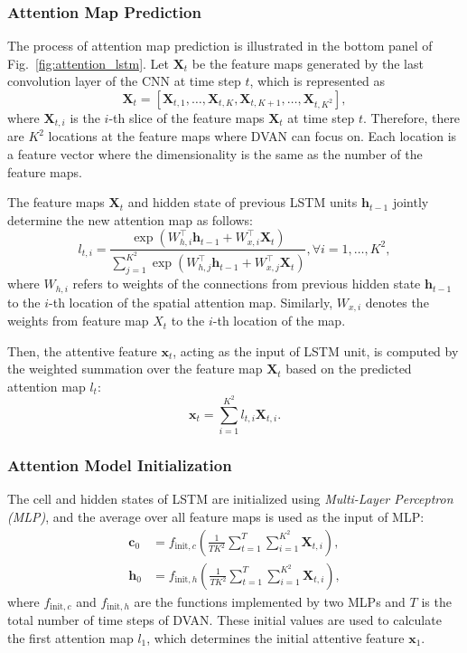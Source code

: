 \documentclass[journal]{IEEEtran}
\begin{document}
\subsubsection{Attention Map Prediction}
The process of attention map prediction is illustrated in the bottom panel of Fig.~\ref{fig:attention_lstm}. Let $\mathbf{X}_t$ be the feature maps generated by the last convolution layer of the CNN at time step $t$, which is represented as
\begin{equation}
\mathbf{X}_t = [\mathbf{X}_{t,1},\ldots,\mathbf{X}_{t,K},\mathbf{X}_{t,K+1},\ldots,\mathbf{X}_{t,K^2}],
\end{equation}
where $\mathbf{X}_{t,i}$ is the $i$-th slice of the feature maps $\mathbf{X}_t$ at time step $t$. Therefore, there are $K^2$ locations at the feature maps where DVAN can focus on. Each location is a feature vector where the dimensionality is the same as the number of the feature maps.

The feature maps $\mathbf{X}_t$ and hidden state of previous LSTM units $\mathbf{h}_{t-1}$ jointly determine the new attention map as follows:
\begin{equation}
  \label{eq:attention}
   l_{t,i}   =\frac{\exp(W_{h,i}^\top \mathbf{h}_{t-1} + W_{x,i}^\top \mathbf{X}_{t})}{\sum_{j=1}^{K^2}\exp(W_{h,j}^\top \mathbf{h}_{t-1} + W_{x,j}^\top \mathbf{X}_{t})},
             \forall i = 1, \ldots, K^2,
\end{equation}
where $W_{h,i}$ refers to weights of the connections from previous hidden state $\mathbf{h}_{t-1}$ to the $i$-th location of the spatial attention map. Similarly, $W_{x,i}$ denotes the weights from feature map $X_t$ to the $i$-th location of the map.

Then, the attentive feature $\mathbf{x}_t $, acting as the input of LSTM unit, is computed by the weighted summation over the feature map $\mathbf{X}_t$ based on the predicted attention map $l_t$:
\begin{equation}
  \mathbf{x}_t =\sum_{i=1}^{K^2}l_{t,i}\mathbf{X}_{t,i}.
  \label{eq:attention_pool}
\end{equation}

\subsubsection{Attention Model Initialization}
The cell and hidden states of LSTM are initialized using \emph{Multi-Layer Perceptron (MLP)}, and the average over all feature maps is used as the input of MLP:
\begin{align}
  \mathbf{c}_0&=f_{\text{init},c}\left(\frac{1}{TK^2}\sum^T_{t=1}\sum^{K^2}_{i=1}\mathbf{X}_{t,i}\right),\\
  \mathbf{h}_0&=f_{\text{init},h}\left(\frac{1}{TK^2}\sum^T_{t=1}\sum^{K^2}_{i=1}\mathbf{X}_{t,i}\right),
  \label{eq:h0}
\end{align}
where $f_{\text{init},c}$ and $f_{\text{init},h}$ are the functions implemented by two MLPs and $T$ is the total number of time steps of DVAN. These initial values are used to calculate the first attention map $l_1$, which determines the initial attentive feature $\mathbf{x}_1$.
\end{document}
